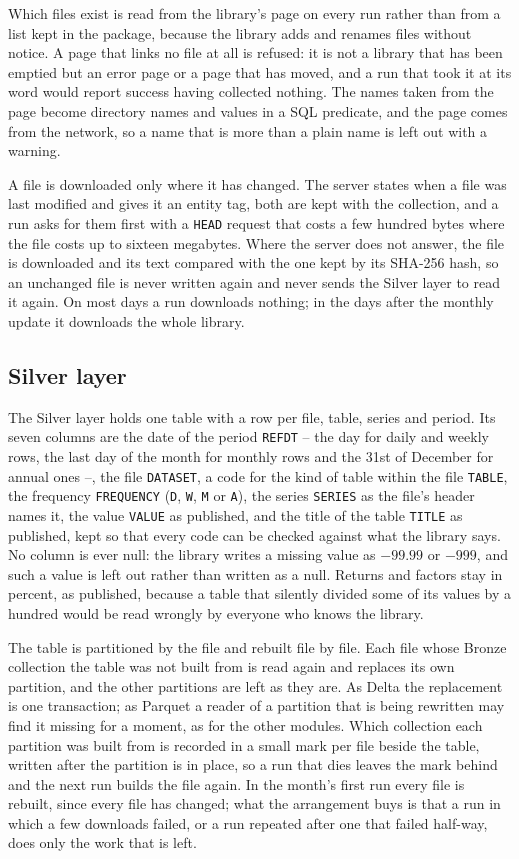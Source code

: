 Which files exist is read from the library's page on every run rather than from a list kept in the package, because the library adds and renames files without notice. A page that links no file at all is refused: it is not a library that has been emptied but an error page or a page that has moved, and a run that took it at its word would report success having collected nothing. The names taken from the page become directory names and values in a SQL predicate, and the page comes from the network, so a name that is more than a plain name is left out with a warning.

A file is downloaded only where it has changed. The server states when a file was last modified and gives it an entity tag, both are kept with the collection, and a run asks for them first with a \verb|HEAD| request that costs a few hundred bytes where the file costs up to sixteen megabytes. Where the server does not answer, the file is downloaded and its text compared with the one kept by its SHA-256 hash, so an unchanged file is never written again and never sends the Silver layer to read it again. On most days a run downloads nothing; in the days after the monthly update it downloads the whole library.

\subsection{Silver layer}

The Silver layer holds one table with a row per file, table, series and period. Its seven columns are the date of the period \verb|REFDT| -- the day for daily and weekly rows, the last day of the month for monthly rows and the 31st of December for annual ones --, the file \verb|DATASET|, a code for the kind of table within the file \verb|TABLE|, the frequency \verb|FREQUENCY| (\verb|D|, \verb|W|, \verb|M| or \verb|A|), the series \verb|SERIES| as the file's header names it, the value \verb|VALUE| as published, and the title of the table \verb|TITLE| as published, kept so that every code can be checked against what the library says. No column is ever null: the library writes a missing value as $-99.99$ or $-999$, and such a value is left out rather than written as a null. Returns and factors stay in percent, as published, because a table that silently divided some of its values by a hundred would be read wrongly by everyone who knows the library.

The table is partitioned by the file and rebuilt file by file. Each file whose Bronze collection the table was not built from is read again and replaces its own partition, and the other partitions are left as they are. As Delta the replacement is one transaction; as Parquet a reader of a partition that is being rewritten may find it missing for a moment, as for the other modules. Which collection each partition was built from is recorded in a small mark per file beside the table, written after the partition is in place, so a run that dies leaves the mark behind and the next run builds the file again. In the month's first run every file is rebuilt, since every file has changed; what the arrangement buys is that a run in which a few downloads failed, or a run repeated after one that failed half-way, does only the work that is left.

